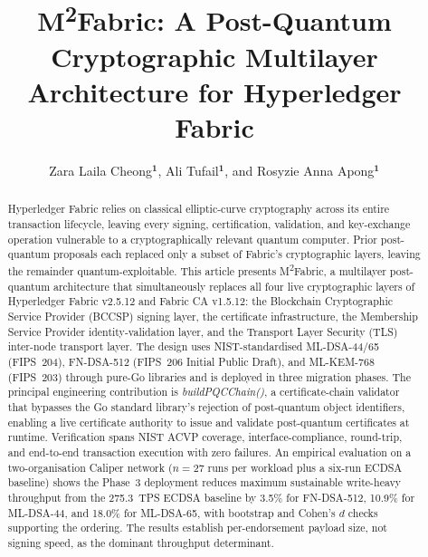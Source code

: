 \documentclass{ieeetj}
\newcommand{\mfabric}{M\textsuperscript{2}Fabric}
\def\authorrefmark#1{\ensuremath{^{\textbf{#1}}}}
\begin{document}


\title{\mfabric{}: A Post-Quantum Cryptographic Multilayer Architecture for Hyperledger Fabric}

\author{Zara Laila Cheong\authorrefmark{1}, Ali Tufail\authorrefmark{1}, and Rosyzie Anna Apong\authorrefmark{1}}


\begin{abstract}
{Hyperledger Fabric relies on classical elliptic-curve cryptography across
its entire transaction lifecycle, leaving every signing, certification,
validation, and key-exchange operation vulnerable to a cryptographically
relevant quantum computer. Prior post-quantum proposals each replaced only
a subset of Fabric's cryptographic layers, leaving the remainder
quantum-exploitable. This article presents \mfabric{}, a multilayer
post-quantum architecture that simultaneously replaces all four live
cryptographic layers of Hyperledger Fabric v2.5.12 and Fabric CA v1.5.12:
the Blockchain Cryptographic Service Provider (BCCSP) signing layer, the
certificate infrastructure, the Membership Service Provider
identity-validation layer, and the Transport Layer Security (TLS)
inter-node transport layer. The design uses NIST-standardised
ML-DSA-44/65 (FIPS~204), FN-DSA-512 (FIPS~206 Initial Public Draft), and
ML-KEM-768 (FIPS~203) through pure-Go libraries and is deployed in three
migration phases. The principal engineering contribution is
\textit{buildPQCChain()}, a certificate-chain validator that bypasses the
Go standard library's rejection of post-quantum object identifiers,
enabling a live certificate authority to issue and validate post-quantum
certificates at runtime. Verification spans NIST ACVP coverage,
interface-compliance, round-trip, and end-to-end transaction execution
with zero failures. An empirical evaluation on a two-organisation Caliper
network ($n=27$ runs per workload plus a six-run ECDSA baseline) shows the
Phase~3 deployment reduces maximum sustainable write-heavy throughput
from the 275.3~TPS ECDSA baseline by 3.5\% for FN-DSA-512, 10.9\% for
ML-DSA-44, and 18.0\% for ML-DSA-65, with bootstrap and Cohen's $d$
checks supporting the ordering. The results establish per-endorsement
payload size, not signing speed, as the dominant throughput determinant.}
\end{abstract}
\end{document}
